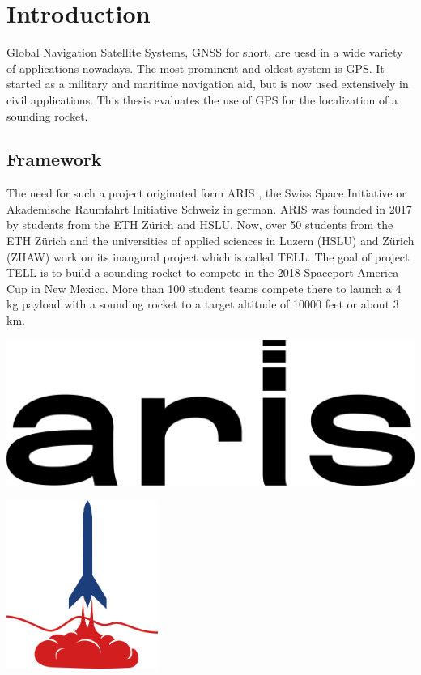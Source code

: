 \chapter{Introduction}

Global Navigation Satellite Systems, GNSS for short, are uesd in a wide variety of applications nowadays.
The most prominent and oldest system is GPS.
It started as a military and maritime navigation aid, but is now used extensively in civil applications.
This thesis evaluates the use of GPS for the localization of a sounding rocket.

\section{Framework}

The need for such a project originated form ARIS \cite{aris}, the Swiss Space Initiative or Akademische Raumfahrt Initiative Schweiz in german.
ARIS was founded in 2017 by students from the ETH Z\"urich and HSLU.
Now, over 50 students from the ETH Z\"urich and the universities of applied sciences in Luzern (HSLU) and Z\"urich (ZHAW) work on its inaugural project which is called TELL.
The goal of project TELL is to build a sounding rocket to compete in the 2018 Spaceport America Cup in New Mexico.
More than 100 student teams compete there to launch a 4 kg payload with a sounding rocket to a target altitude of 10000 feet or about 3 km.

\noindent
\begin{minipage}{0.5\textwidth}
 \centering
 \includegraphics[width=\textwidth]{images/ARIS.png}
\end{minipage}
\begin{minipage}{0.5\textwidth}
 \centering
 \includegraphics[height=5.5cm]{images/SAC_Logo.png}
\end{minipage}

